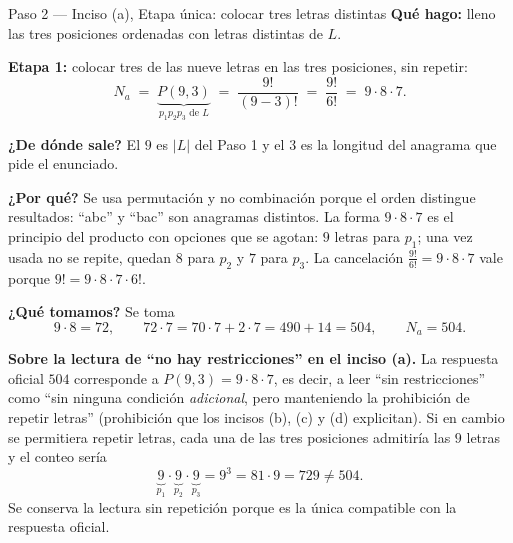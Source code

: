 \documentclass[11pt]{article}
\begin{document}
\begin{paso}{Paso 2 --- Inciso (a), Etapa única: colocar tres letras distintas}
\textbf{Qué hago:} lleno las tres posiciones ordenadas con letras distintas de $L$.

\medskip
\textbf{Etapa 1:} colocar tres de las nueve letras en las tres posiciones, sin repetir:
\[
  N_a \;=\; \underbrace{P(9,3)}_{p_1p_2p_3 \text{ de }L} \;=\; \frac{9!}{(9-3)!} \;=\; \frac{9!}{6!} \;=\; 9\cdot 8\cdot 7 .
\]

\textbf{¿De dónde sale?} El $9$ es $|L|$ del Paso 1 y el $3$ es la longitud del anagrama que pide el enunciado.

\textbf{¿Por qué?} Se usa permutación y no combinación porque el orden distingue resultados: ``abc'' y ``bac'' son anagramas distintos. La forma $9\cdot 8\cdot 7$ es el principio del producto con opciones que se agotan: $9$ letras para $p_1$; una vez usada no se repite, quedan $8$ para $p_2$ y $7$ para $p_3$. La cancelación $\frac{9!}{6!}=9\cdot 8\cdot 7$ vale porque $9!=9\cdot 8\cdot 7\cdot 6!$.

\textbf{¿Qué tomamos?} Se toma
\[
  9\cdot 8 = 72,\qquad 72\cdot 7 = 70\cdot 7 + 2\cdot 7 = 490+14 = 504,\qquad N_a=504 .
\]
\end{paso}

\begin{nota}
\textbf{Sobre la lectura de ``no hay restricciones'' en el inciso (a).} La respuesta oficial $504$ corresponde a $P(9,3)=9\cdot 8\cdot 7$, es decir, a leer ``sin restricciones'' como ``sin ninguna condición \emph{adicional}, pero manteniendo la prohibición de repetir letras'' (prohibición que los incisos (b), (c) y (d) explicitan). Si en cambio se permitiera repetir letras, cada una de las tres posiciones admitiría las $9$ letras y el conteo sería
\[
  \underbrace{9}_{p_1}\cdot\underbrace{9}_{p_2}\cdot\underbrace{9}_{p_3} = 9^3 = 81\cdot 9 = 729 \neq 504 .
\]
Se conserva la lectura sin repetición porque es la única compatible con la respuesta oficial.
\end{nota}
\end{document}
